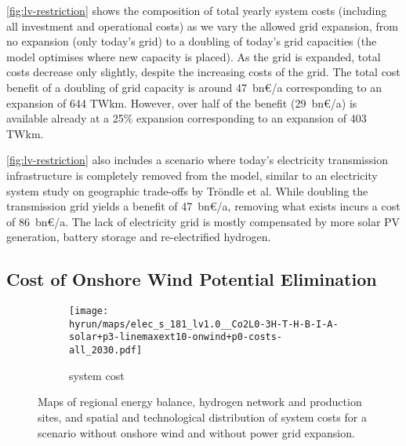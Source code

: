 \cref{fig:lv-restriction} shows the composition of total yearly system costs
(including all investment and operational costs) as we vary the allowed grid
expansion, from no expansion (only today's grid) to a doubling of today's grid
capacities (the model optimises where new capacity is placed). As the grid is
expanded, total costs decrease only slightly, despite the increasing costs of
the grid. The total cost benefit of a doubling of grid capacity is around
47~bn\euro/a corresponding to an expansion of 644 TWkm. However, over
half of the benefit (29~bn\euro/a) is available already at a 25\%
expansion corresponding to an expansion of 403 TWkm.

\cref{fig:lv-restriction} also includes a scenario where today's electricity
transmission infrastructure is completely removed from the model, similar to an
electricity system study on geographic trade-offs by Tröndle et
al. While doubling the transmission grid
yields a benefit of 47~bn\euro/a, removing what exists incurs a cost of
86~bn\euro/a. The lack of electricity grid is mostly compensated by more solar
PV generation, battery storage and re-electrified hydrogen.

\subsection{Cost of Onshore Wind Potential Elimination}
\label{sec:si:onw}

\begin{figure}
    \centering
    \begin{subfigure}[t]{0.6\textwidth}
        \centering
        \caption{system cost}
        \texttt{[image: \\hyrun/maps/elec\_s\_181\_lv1.0\_\_Co2L0-3H-T-H-B-I-A-solar+p3-linemaxext10-onwind+p0-costs-all\_2030.pdf]}
        \label{fig:no-onw:tsc}
    \end{subfigure}
    \caption{Maps of regional energy balance, hydrogen network and production sites, and spatial and technological distribution of system costs for a scenario without onshore wind and without power grid expansion.}
    \label{fig:no-onw}
\end{figure}

